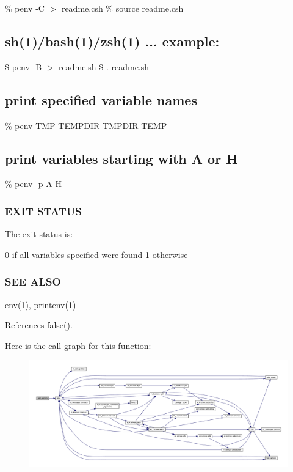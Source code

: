 \% penv -\/C $>$ readme.\+csh \% source readme.\+csh \subsection*{sh(1)/bash(1)/zsh(1) ... example\+:}

\$ penv -\/B $>$ readme.\+sh \$ . readme.\+sh \subsection*{print specified variable names}

\% penv T\+MP T\+E\+M\+P\+D\+IR T\+M\+P\+D\+IR T\+E\+MP \subsection*{print variables starting with A or H}

\% penv -\/p A H

\subsubsection*{E\+X\+IT S\+T\+A\+T\+US}

The exit status is\+:

0 if all variables specified were found 1 otherwise \subsubsection*{S\+EE A\+L\+SO}

env(1), printenv(1) 

References false().

Here is the call graph for this function\+:
\nopagebreak
\begin{figure}[H]
\begin{center}
\leavevmode
\includegraphics[width=350pt]{penv_8f90_a39c21619b08a3c22f19e2306efd7f766_cgraph}
\end{center}
\end{figure}
\mbox{\label{penv_8f90_a01dea0dd27ab167506a724b2d0aeb2b5}} 
